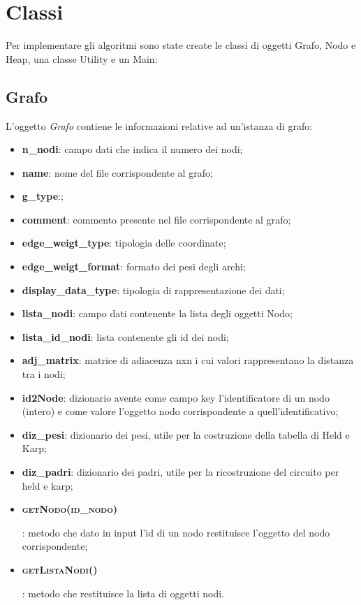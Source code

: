 \section{Classi}
\label{Classi}

Per implementare gli algoritmi sono state create le classi di oggetti Grafo, Nodo e Heap, una classe Utility e un Main:

\subsection{Grafo}
\label{grafo}

L'oggetto \textit{Grafo} contiene le informazioni relative ad un'istanza di grafo:

\begin{itemize}
    \item \textbf{n\_nodi}: campo dati che indica il numero dei nodi;
    \item \textbf{name}: nome del file corrispondente al grafo;
    \item \textbf{g\_type}:;
    \item \textbf{comment}: commento presente nel file corrispondente al grafo;
    \item \textbf{edge\_weigt\_type}: tipologia delle coordinate;
    \item \textbf{edge\_weigt\_format}: formato dei pesi degli archi;
    \item \textbf{display\_data\_type}: tipologia di rappresentazione dei dati;
    \item \textbf{lista\_nodi}: campo dati contenente la lista degli oggetti Nodo; 
    \item \textbf{lista\_id\_nodi}: lista contenente gli id dei nodi;
    \item \textbf{adj\_matrix}: matrice di adiacenza nxn i cui valori rappresentano la distanza tra i nodi;
    \item \textbf{id2Node}: dizionario avente come campo key l'identificatore di un nodo (intero) e come valore l'oggetto nodo corrispondente a quell'identificativo;
    \item \textbf{diz\_pesi}: dizionario dei pesi, utile per la costruzione della tabella di Held e Karp;
    \item \textbf{diz\_padri}: dizionario dei padri, utile per la ricostruzione del circuito per held e karp;
    \item \hypertarget{getnodo}{\textbf{\textsc{getNodo(id\_nodo)}}}: metodo che dato in input l'id di un nodo restituisce l'oggetto del nodo corrispondente;
    \item \hypertarget{getlistanodi}{\textbf{\textsc{getListaNodi()}}}: metodo che restituisce la lista di  oggetti nodi.
\end{itemize}

